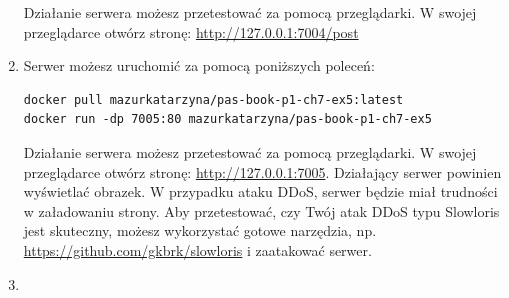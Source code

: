 \begin{enumerate}[label=\textbf{7.\arabic*}]
\noindent Działanie serwera możesz przetestować za pomocą przeglądarki. W swojej przeglądarce otwórz stronę: \url{http://127.0.0.1:7004/post}
\item Serwer możesz uruchomić za pomocą poniższych poleceń:

\begin{verbatim}
docker pull mazurkatarzyna/pas-book-p1-ch7-ex5:latest
docker run -dp 7005:80 mazurkatarzyna/pas-book-p1-ch7-ex5
\end{verbatim}

\noindent Działanie serwera możesz przetestować za pomocą przeglądarki. W swojej przeglądarce otwórz stronę: \url{http://127.0.0.1:7005}. Działający serwer powinien wyświetlać obrazek. W przypadku ataku DDoS, serwer będzie miał trudności w załadowaniu strony. Aby przetestować, czy Twój atak DDoS typu Slowloris jest skuteczny, możesz wykorzystać gotowe narzędzia, np. \url{https://github.com/gkbrk/slowloris} i zaatakować serwer.


\item 



\end{enumerate}
